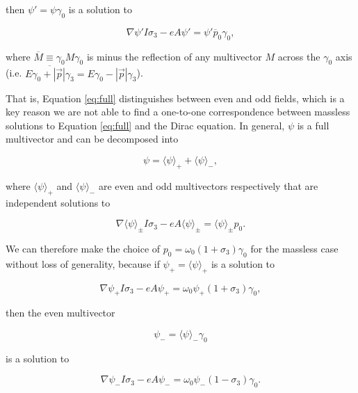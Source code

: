 \documentclass{article}
\begin{document}
  then $\psi' = \psi \gamma_0$ is a solution to

  \begin{equation}
    \nabla \psi' I \sigma_3 - e A \psi' = \psi' \overline p_0 \gamma_0, \label{eq:minus}
  \end{equation}

  where $\overline M \equiv \gamma_0M\gamma_0$ is minus the reflection of any multivector $M$ across the $\gamma_0$ axis (i.e. $\overline{E \gamma_0 + |\vec p|\gamma_3} = E \gamma_0 - |\vec p|\gamma_3$).

  That is, Equation \ref{eq:full} distinguishes between even and odd fields, which is a key reason we are not able to find a one-to-one correspondence between massless solutions to Equation \ref{eq:full} and the Dirac equation. In general, $\psi$ is a full multivector and can be decomposed into

  \begin{equation}
    \psi = \langle \psi \rangle_+ + \langle \psi \rangle_-,
  \end{equation}

  where $\langle \psi \rangle_+$ and $\langle \psi \rangle_-$ are even and odd multivectors respectively that are independent solutions to

  \begin{equation}
    \nabla \langle \psi \rangle_\pm I \sigma_3 - e A \langle \psi \rangle_\pm = \langle \psi \rangle_\pm p_0.\label{eq:decoupled}
  \end{equation}

  We can therefore make the choice of $p_0 = \omega_0 (1 + \sigma_3) \gamma_0$ for the massless case without loss of generality, because if $\psi_+ = \langle \psi \rangle_+$ is a solution to

  \begin{equation}
    \nabla \psi_+ I \sigma_3 - e A \psi_+ = \omega_0 \psi_+ (1 + \sigma_3) \gamma_0,\label{eq:even}
  \end{equation}

  then the even multivector 

  \begin{equation}
    \psi_- = \langle \psi \rangle_- \gamma_0\label{eq:0decomposition}
  \end{equation} 

  is a solution to

  \begin{equation}
    \nabla \psi_- I \sigma_3 - e A \psi_- = \omega_0 \psi_- (1 - \sigma_3) \gamma_0.\label{eq:odd}
  \end{equation}
\end{document}
